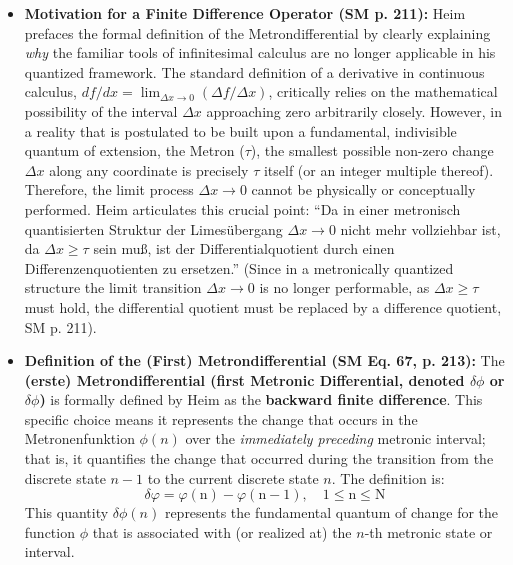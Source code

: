 \documentclass[12pt]{article}
\newcommand{\q}[1]{\enquote{#1}}
\newcommand{\metron}{\tau}
\newcommand{\metrondifferential}{\delta}
\newcommand{\metronenziffer}{n}
\begin{document}
\begin{itemize}
    \item \textbf{Motivation for a Finite Difference Operator (SM p. 211):}
    Heim prefaces the formal definition of the Metrondifferential by clearly explaining \textit{why} the familiar tools of infinitesimal calculus are no longer applicable in his quantized framework. The standard definition of a derivative in continuous calculus, \( df/dx = \lim_{\Delta x\to 0} (\Delta f/\Delta x) \), critically relies on the mathematical possibility of the interval \( \Delta x \) approaching zero arbitrarily closely. However, in a reality that is postulated to be built upon a fundamental, indivisible quantum of extension, the Metron (\( \metron \)), the smallest possible non-zero change \( \Delta x \) along any coordinate is precisely \( \metron \) itself (or an integer multiple thereof). Therefore, the limit process \( \Delta x \to 0 \) cannot be physically or conceptually performed. Heim articulates this crucial point: \q{Da in einer metronisch quantisierten Struktur der Limesübergang \( \Delta x \to 0 \) nicht mehr vollziehbar ist, da \( \Delta x \geq \tau \) sein muß, ist der Differentialquotient durch einen Differenzenquotienten zu ersetzen.} (Since in a metronically quantized structure the limit transition \( \Delta x \to 0 \) is no longer performable, as \( \Delta x \geq \tau \) must hold, the differential quotient must be replaced by a difference quotient, SM p. 211).

    \item \textbf{Definition of the (First) Metrondifferential (SM Eq. 67, p. 213):}
    The \textbf{(erste) Metrondifferential (first Metronic Differential, denoted \( \metrondifferential\phi \) or \( \delta\phi \))} is formally defined by Heim as the \textbf{backward finite difference}. This specific choice means it represents the change that occurs in the Metronenfunktion \( \phi(\metronenziffer) \) over the \textit{immediately preceding} metronic interval; that is, it quantifies the change that occurred during the transition from the discrete state \( \metronenziffer-1 \) to the current discrete state \( \metronenziffer \). The definition is:
    \begin{equation}
    \delta\varphi = \varphi(\mathrm{n}) - \varphi(\mathrm{n}-1), \quad 1 \le \mathrm{n} \le \mathrm{N} \tag{67}
    \label{eq:original_first_metrondifferential}
    \end{equation}
    This quantity \( \metrondifferential\phi(\metronenziffer) \) represents the fundamental quantum of change for the function \( \phi \) that is associated with (or realized at) the \( \metronenziffer \)-th metronic state or interval.


\end{itemize}
\end{document}
